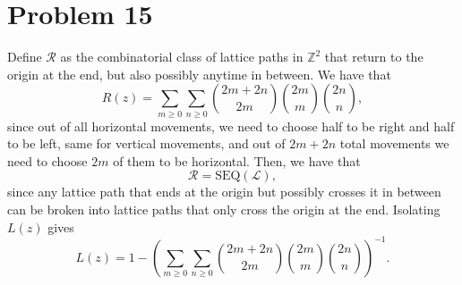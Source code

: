 \documentclass{article}
\newcommand{\Z}{\mathbb{Z}}
\newcommand{\bigp}[1]{\left(#1\right)}
\begin{document}
\section*{Problem 15}
Define $\mathcal{R}$ as the combinatorial class of lattice paths in $\Z^2$ that return to the origin at the end, but also possibly anytime in between. We have that
$$R(z) = \sum_{m \ge 0} \sum_{n \ge 0} \binom{2m + 2n}{2m} \binom{2m}{m} \binom{2n}{n},$$
since out of all horizontal movements, we need to choose half to be right and half to be left, same for vertical movements, and out of $2m + 2n$ total movements we need to choose $2m$ of them to be horizontal. Then, we have that
$$\mathcal{R} = \mathrm{SEQ}(\mathcal{L}),$$
since any lattice path that ends at the origin but possibly crosses it in between can be broken into lattice paths that only cross the origin at the end. Isolating $L(z)$ gives
$$L(z) = 1 - \bigp{\sum_{m \ge 0} \sum_{n \ge 0} \binom{2m + 2n}{2m} \binom{2m}{m} \binom{2n}{n}}^{-1}.$$
\end{document}
